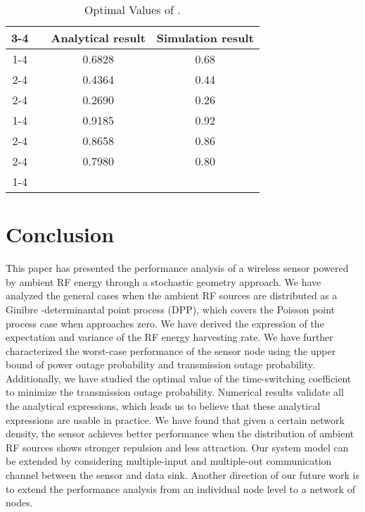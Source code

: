 \documentclass[12pt,draftclsnofoot,onecolumn]{IEEEtran}
\begin{document}
\begin{table}
\centering 
\caption{\footnotesize Optimal Values of .} \label{Optimal_tau}
\begin{tabular}{cc|c|c|}
\cline{3-4}
& & Analytical result & Simulation result  \\ 
\cline{1-4}
\multicolumn{1}{ |c| }{\multirow{3}{*}{} } &  & 0.6828  &  0.68   \\ 
\cline{2-4}
\multicolumn{1}{ |c|  }{}    &  &   0.4364  &   0.44 
  \\ 
\cline{2-4}
\multicolumn{1}{ |c|  }{}    &    &   0.2690  &   0.26     \\ 
\cline{1-4}
\multicolumn{1}{ |c|  }{\multirow{3}{*}{}}   &    &   0.9185  & 0.92  \\ 
\cline{2-4}
\multicolumn{1}{ |c|  }{}   &     &    
0.8658  &  0.86        \\ 
\cline{2-4}
\multicolumn{1}{ |c|  }{}   &    &  0.7980   &     0.80   \\ 
\cline{1-4}
\end{tabular}  
\centering
\end{table}

\section{Conclusion}
\label{sec:conclusion}
This paper has presented the performance analysis of a wireless sensor powered by ambient RF energy through a stochastic geometry approach. We have analyzed the general cases when the ambient RF sources are distributed as a Ginibre -determinantal point process (DPP), which covers the Poisson point process case when  approaches zero. We  have derived the expression of the expectation and variance of the RF energy harvesting rate. We have further characterized the worst-case performance of the sensor node using the upper bound of power outage probability and transmission outage probability. Additionally, we have studied the optimal value of the time-switching coefficient to minimize the transmission outage probability. Numerical results validate all the analytical expressions, which leads us to believe that these analytical expressions are usable in practice. We have found that given a certain network density, the sensor achieves better performance when the distribution of ambient RF sources shows stronger repulsion and less attraction. Our system model can be extended by considering multiple-input and multiple-out communication channel between the sensor and data sink. Another direction of our future work is to extend the performance analysis from an individual node level to a network of nodes. 
\end{document}
